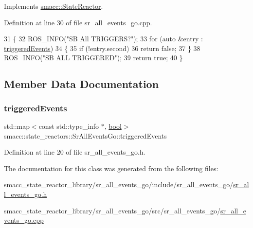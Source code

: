 Implements \hyperlink{classsmacc_1_1StateReactor_a445bc3c90980d75d7d815b85cfb68b21}{smacc\+::\+State\+Reactor}.



Definition at line 30 of file sr\+\_\+all\+\_\+events\+\_\+go.\+cpp.


\begin{DoxyCode}
31 \{
32     ROS\_INFO(\textcolor{stringliteral}{"SB All TRIGGERS?"});
33     \textcolor{keywordflow}{for} (\textcolor{keyword}{auto} &entry : \hyperlink{classsmacc_1_1state__reactors_1_1SrAllEventsGo_a2c3d7c7e15ed155ae6e83fe49e7897e9}{triggeredEvents})
34     \{
35         \textcolor{keywordflow}{if} (!entry.second)
36             \textcolor{keywordflow}{return} \textcolor{keyword}{false};
37     \}
38     ROS\_INFO(\textcolor{stringliteral}{"SB ALL TRIGGERED"});
39     \textcolor{keywordflow}{return} \textcolor{keyword}{true};
40 \}
\end{DoxyCode}


\subsection{Member Data Documentation}
\mbox{\label{classsmacc_1_1state__reactors_1_1SrAllEventsGo_a2c3d7c7e15ed155ae6e83fe49e7897e9}} 
\subsubsection{\texorpdfstring{triggered\+Events}{triggeredEvents}}
{\footnotesize\ttfamily std\+::map$<$const std\+::type\+\_\+info $\ast$, \hyperlink{classbool}{bool}$>$ smacc\+::state\+\_\+reactors\+::\+Sr\+All\+Events\+Go\+::triggered\+Events\hspace{0.3cm}{\ttfamily [private]}}



Definition at line 20 of file sr\+\_\+all\+\_\+events\+\_\+go.\+h.



The documentation for this class was generated from the following files\+:\begin{DoxyCompactItemize}
\item 
smacc\+\_\+state\+\_\+reactor\+\_\+library/sr\+\_\+all\+\_\+events\+\_\+go/include/sr\+\_\+all\+\_\+events\+\_\+go/\hyperlink{sr__all__events__go_8h}{sr\+\_\+all\+\_\+events\+\_\+go.\+h}\item 
smacc\+\_\+state\+\_\+reactor\+\_\+library/sr\+\_\+all\+\_\+events\+\_\+go/src/sr\+\_\+all\+\_\+events\+\_\+go/\hyperlink{sr__all__events__go_8cpp}{sr\+\_\+all\+\_\+events\+\_\+go.\+cpp}\end{DoxyCompactItemize}
